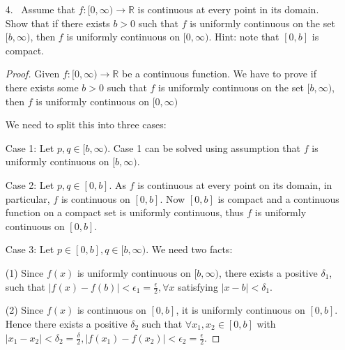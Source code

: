 \documentclass[10pt]{article}
\theoremstyle{definition}
\begin{document}
\begin{enumerate}

\item[4.]  ~Assume that $f:[0,\infty) \to \mathbb{R}$ is continuous at every point in its domain.  Show that if there exists $b > 0$ such that $f$ is uniformly continuous on the set $[b,\infty)$, then $f$ is uniformly continuous on $[0,\infty)$.  Hint: note that $[0,b]$ is compact.


\begin{proof}
Given $f:[0,\infty) \to \mathbb{R}$ be a continuous function.  We have to prove if there exists some $b > 0$ such that $f$ is uniformly continuous on the set $[b,\infty)$, then $f$ is uniformly continuous on $[0,\infty)$

We need to split this into three cases:

Case 1:
Let $p, q \in [b, \infty)$.  Case 1 can be solved using assumption that $f$ is uniformly continuous on $[b,\infty)$. 

Case 2:
Let $p, q \in [0,b]$.
As $f$ is continuous at every point on its domain, in particular, $f$ is continuous on  $[0, b]$.  Now $[0, b]$ is compact and a continuous function on a compact set is uniformly continuous, thus $f$ is uniformly continuous on $[0, b]$.  

Case 3:  
Let $p \in [0,b], q \in [b, \infty)$.  We need two facts:

(1) Since $f(x)$ is uniformly continuous on $[b, \infty)$, there exists a positive $\delta_1$, such that $|f(x)-f(b)| < \epsilon_1 = \frac{\epsilon}{2}, \forall x$ satisfying $|x-b| < \delta_1$. 

(2) Since $f(x)$ is continuous on $[0,b]$, it is uniformly continuous on $[0,b]$.  Hence there exists a positive $\delta_2$ such that $\forall x_1, x_2 \in [0,b]$ with $|x_1-x_2|<\delta_2 = \frac{\delta}{2}, |f(x_1)-f(x_2)| < \epsilon_2 = \frac{\epsilon}{2}$.


\end{proof}
\end{enumerate}
\end{document}
